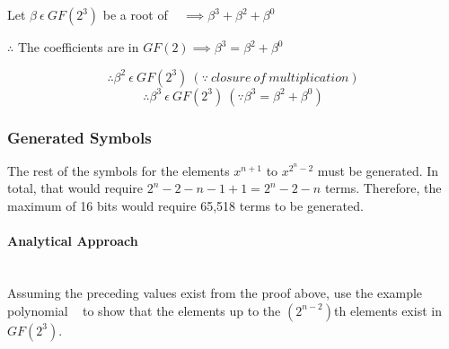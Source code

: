         \hspace*{\fill}
        \centerline{Let $\beta \ \epsilon \ GF(2^{3})$ be a root of
        \examplepoly~ $\implies \beta^{3} + \beta^{2} + \beta^{0}$}
        \hspace*{\fill}
        \centerline{$\therefore$ The coefficients are in $GF(2) \implies
        \beta^{3} = \beta^{2} + \beta^{0}$}
        \[ \therefore \beta^{2} \ \epsilon \ GF(2^{3}) \ (\because \ closure \
        of \ multiplication) \]
        \[ \therefore \beta^{3} \ \epsilon \ GF(2^{3}) \ (\because \beta^{3} =
        \beta^{2} + \beta^{0}) \]

    \subsubsection{Generated Symbols} The rest of the symbols for the elements
    $x^{n+1}$ to $x^{2^{n}-2}$ must be generated. In total, that would require
    $2^{n}-2-n-1+1=2^{n}-2-n$ terms. Therefore, the maximum of 16 bits would
    require 65,518 terms to be generated.

        \paragraph{Analytical Approach} \leavevmode \\ Assuming the preceding
        values exist from the proof above, use the example polynomial
        \examplepoly~ to show that the elements up to the $(2^{n-2})$th
        elements exist in $GF(2^{3})$.

